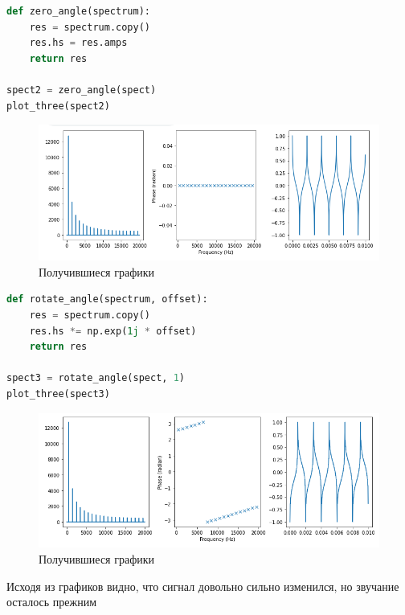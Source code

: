 \begin{lstlisting}[language=Python]
def zero_angle(spectrum):
    res = spectrum.copy()
    res.hs = res.amps
    return res
    
spect2 = zero_angle(spect)
plot_three(spect2)
\end{lstlisting}

\begin{figure}[H]
	\begin{center}
		\includegraphics[scale=0.66]{fig/lab06/lab06_12.png}
		\caption{Получившиеся графики}
	\end{center}
\end{figure}

\begin{lstlisting}[language=Python]
def rotate_angle(spectrum, offset):
    res = spectrum.copy()
    res.hs *= np.exp(1j * offset)
    return res
    
spect3 = rotate_angle(spect, 1)
plot_three(spect3)
\end{lstlisting}

\begin{figure}[H]
	\begin{center}
		\includegraphics[scale=0.66]{fig/lab06/lab06_13.png}
		\caption{Получившиеся графики}
	\end{center}
\end{figure}

Исходя из графиков видно, что сигнал довольно сильно изменился, но звучание осталось прежним

